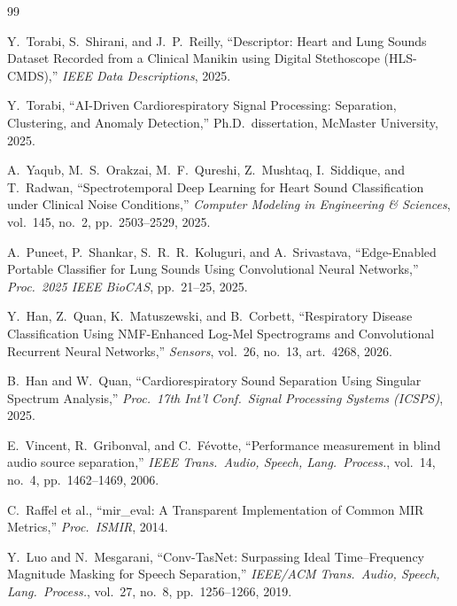 \documentclass[journal]{IEEEtran}
\begin{document}
\begin{thebibliography}{99}

 Y.\ Torabi, S.\ Shirani, and J.\ P.\ Reilly, ``Descriptor: Heart and Lung Sounds Dataset Recorded from a Clinical Manikin using Digital Stethoscope (HLS-CMDS),'' \emph{IEEE Data Descriptions}, 2025.

 Y.\ Torabi, ``AI-Driven Cardiorespiratory Signal Processing: Separation, Clustering, and Anomaly Detection,'' Ph.D.\ dissertation, McMaster University, 2025.

 A.\ Yaqub, M.\ S.\ Orakzai, M.\ F.\ Qureshi, Z.\ Mushtaq, I.\ Siddique, and T.\ Radwan, ``Spectrotemporal Deep Learning for Heart Sound Classification under Clinical Noise Conditions,'' \emph{Computer Modeling in Engineering \& Sciences}, vol.\ 145, no.\ 2, pp.\ 2503--2529, 2025.

 A.\ Puneet, P.\ Shankar, S.\ R.\ R.\ Koluguri, and A.\ Srivastava, ``Edge-Enabled Portable Classifier for Lung Sounds Using Convolutional Neural Networks,'' \emph{Proc.\ 2025 IEEE BioCAS}, pp.\ 21--25, 2025.

 Y.\ Han, Z.\ Quan, K.\ Matuszewski, and B.\ Corbett, ``Respiratory Disease Classification Using NMF-Enhanced Log-Mel Spectrograms and Convolutional Recurrent Neural Networks,'' \emph{Sensors}, vol.\ 26, no.\ 13, art.\ 4268, 2026.

 B.\ Han and W.\ Quan, ``Cardiorespiratory Sound Separation Using Singular Spectrum Analysis,'' \emph{Proc.\ 17th Int'l Conf.\ Signal Processing Systems (ICSPS)}, 2025.

 E.\ Vincent, R.\ Gribonval, and C.\ F\'evotte, ``Performance measurement in blind audio source separation,'' \emph{IEEE Trans.\ Audio, Speech, Lang.\ Process.}, vol.\ 14, no.\ 4, pp.\ 1462--1469, 2006.

 C.\ Raffel et al., ``mir\_eval: A Transparent Implementation of Common MIR Metrics,'' \emph{Proc.\ ISMIR}, 2014.

 Y.\ Luo and N.\ Mesgarani, ``Conv-TasNet: Surpassing Ideal Time--Frequency Magnitude Masking for Speech Separation,'' \emph{IEEE/ACM Trans.\ Audio, Speech, Lang.\ Process.}, vol.\ 27, no.\ 8, pp.\ 1256--1266, 2019.

\end{thebibliography}
\end{document}
